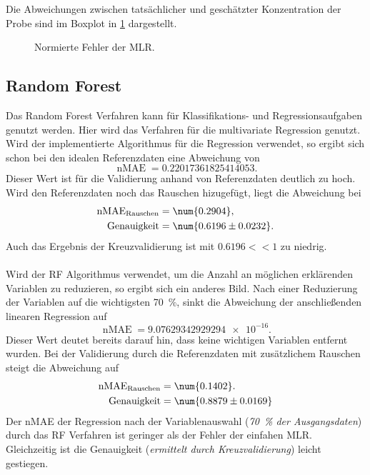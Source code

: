 Die Abweichungen zwischen tatsächlicher und geschätzter Konzentration der Probe sind im Boxplot in \cref{fig:MLRerror} dargestellt.
\begin{figure} [htb]
  \centering
  
  \caption{Normierte Fehler der MLR.}
  \label{fig:MLRerror}
\end{figure}

\subsection{Random Forest}
Das Random Forest Verfahren kann für Klassifikations- und Regressionsaufgaben genutzt werden.
Hier wird das Verfahren für die multivariate Regression genutzt.
Wird der implementierte Algorithmus für die Regression verwendet, so ergibt sich schon bei den idealen Referenzdaten eine Abweichung von
\begin{equation*}
  \operatorname{nMAE} = \num{0.22017361825414053}.
\end{equation*}
Dieser Wert ist für die Validierung anhand von Referenzdaten deutlich zu hoch.
Wird den Referenzdaten noch das Rauschen hizugefügt, liegt die Abweichung bei
\begin{align*}
  \operatorname{nMAE}_\mathrm{Rauschen} &= \num{0.2904}, \\
  \operatorname{Genauigkeit} &= \num{0.6196 \pm 0.0232}.
\end{align*}
Auch das Ergebnis der Kreuzvalidierung ist mit $0.6196 << 1$ zu niedrig.

\paragraph{} Wird der \gls{RF} Algorithmus verwendet, um die Anzahl an möglichen erklärenden Variablen zu reduzieren, so ergibt sich ein anderes Bild.
Nach einer Reduzierung der Variablen auf die wichtigsten \SI{70}{\percent}, sinkt die Abweichung der anschließenden linearen Regression auf
\begin{equation*}
  \operatorname{nMAE} = \num{9.07629342929294e-16}.
\end{equation*}
Dieser Wert deutet bereits darauf hin, dass keine wichtigen Variablen entfernt wurden.
Bei der Validierung durch die Referenzdaten mit zusätzlichem Rauschen steigt die Abweichung auf
\begin{align*}
  \operatorname{nMAE}_\mathrm{Rauschen} &= \num{0.1402}. \\
  \operatorname{Genauigkeit} &= \num{0.8879 \pm 0.0169}
\end{align*}
Der \gls{nMAE} der Regression nach der Variablenauswahl (\emph{\SI{70}{\percent} der Ausgangsdaten}) durch das \gls{RF} Verfahren ist geringer als der Fehler der einfahen \gls{MLR}.
Gleichzeitig ist die Genauigkeit (\emph{ermittelt durch Kreuzvalidierung}) leicht gestiegen.

